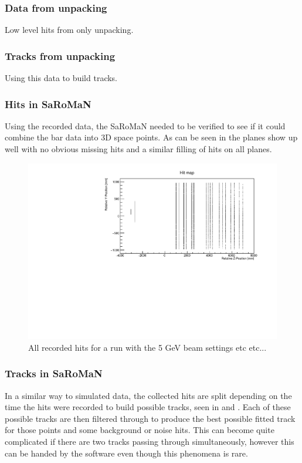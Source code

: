 \subsubsection{Data from unpacking}
Low level hits from only unpacking.

\subsubsection{Tracks from unpacking}
Using this data to build tracks.
\fi

\subsubsection{Hits in SaRoMaN}
Using the recorded data, the SaRoMaN needed to be verified to see if it could combine the bar data into 3D space points. As can be seen in  the planes show up well with no obvious missing hits and a similar filling of hits on all planes.

\begin{figure}[h!]
\centering
\includegraphics[width=\textwidth]{figures/HitMap5GeVYZ.pdf}
\caption{All recorded hits for a run with the 5 GeV beam settings etc etc...}
\label{fig:hitmap}
\end{figure}


\subsubsection{Tracks in SaRoMaN}
In a similar way to simulated data, the collected hits are split depending on the time the hits were recorded to build possible tracks, seen in  and . Each of these possible tracks are then filtered through to produce the best possible fitted track for those points and some background or noise hits. This can become quite complicated if there are two tracks passing through simultaneously, however this can be handed by the software even though this phenomena is rare.

